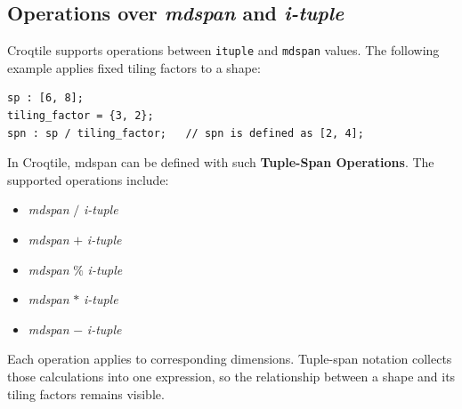 \subsection*{Operations over \emph{mdspan} and \emph{i-tuple}}

Croqtile supports operations between \texttt{ituple} and \texttt{mdspan} values. The following example applies fixed tiling factors to a shape:

\begin{lstlisting}[language=croqtile,caption={Operations over mdspan and i-tuple}]
sp : [6, 8];
tiling_factor = {3, 2};
spn : sp / tiling_factor;   // spn is defined as [2, 4];
\end{lstlisting}

In Croqtile, mdspan can be defined with such \textbf{Tuple-Span Operations}. The supported operations include:

\begin{itemize}[leftmargin=1.6em]
\item \emph{mdspan} $/$ \emph{i-tuple}
\item \emph{mdspan} $+$ \emph{i-tuple}
\item \emph{mdspan} $\%$ \emph{i-tuple}
\item \emph{mdspan} $*$ \emph{i-tuple}
\item \emph{mdspan} $-$ \emph{i-tuple}
\end{itemize}

Each operation applies to corresponding dimensions. Tuple-span notation collects those calculations into one expression, so the relationship between a shape and its tiling factors remains visible.
